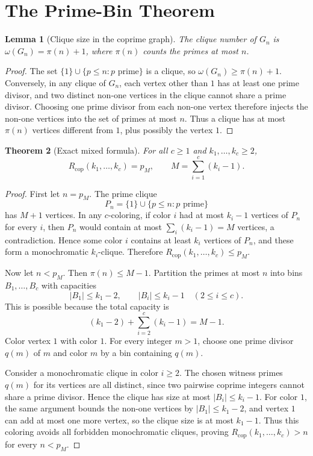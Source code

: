 \documentclass[11pt]{article}
\theoremstyle{plain}
\newtheorem{theorem}{Theorem}[section]
\newtheorem{lemma}[theorem]{Lemma}
\theoremstyle{definition}
\theoremstyle{remark}
\newcommand{\Rcop}{R_{\mathrm{cop}}}
\begin{document}
\section{The Prime-Bin Theorem}
\label{sec:prime-bin}

\begin{lemma}[Clique size in the coprime graph]
\label{lem:max-clique}
The clique number of $G_n$ is $\omega(G_n)=\pi(n)+1$, where $\pi(n)$ counts
the primes at most $n$.
\end{lemma}

\begin{proof}
The set $\{1\}\cup\{p\le n:p\text{ prime}\}$ is a clique, so
$\omega(G_n)\ge \pi(n)+1$.
Conversely, in any clique of $G_n$, each vertex other than $1$ has at least
one prime divisor, and two distinct non-one vertices in the clique cannot
share a prime divisor.  Choosing one prime divisor from each non-one vertex
therefore injects the non-one vertices into the set of primes at most $n$.
Thus a clique has at most $\pi(n)$ vertices different from $1$, plus possibly
the vertex $1$.
\end{proof}

\begin{theorem}[Exact mixed formula]
\label{thm:main}
For all $c\ge 1$ and $k_1,\ldots,k_c\ge 2$,
\[
  \Rcop(k_1,\ldots,k_c)=p_M,
  \qquad
  M=\sum_{i=1}^c(k_i-1).
\]
\end{theorem}

\begin{proof}
First let $n=p_M$.  The prime clique
\[
  P_n=\{1\}\cup\{p\le n:p\text{ prime}\}
\]
has $M+1$ vertices.  In any $c$-coloring, if color $i$ had at most
$k_i-1$ vertices of $P_n$ for every $i$, then $P_n$ would contain at most
$\sum_i(k_i-1)=M$ vertices, a contradiction.  Hence some color $i$ contains
at least $k_i$ vertices of $P_n$, and these form a monochromatic
$k_i$-clique.  Therefore $\Rcop(k_1,\ldots,k_c)\le p_M$.

Now let $n<p_M$.  Then $\pi(n)\le M-1$.  Partition the primes at most $n$
into bins $B_1,\ldots,B_c$ with capacities
\[
  |B_1|\le k_1-2,\qquad |B_i|\le k_i-1\quad (2\le i\le c).
\]
This is possible because the total capacity is
\[
  (k_1-2)+\sum_{i=2}^c(k_i-1)=M-1.
\]
Color vertex $1$ with color $1$.  For every integer $m>1$, choose one prime
divisor $q(m)$ of $m$ and color $m$ by a bin containing $q(m)$.

Consider a monochromatic clique in color $i\ge 2$.  The chosen witness
primes $q(m)$ for its vertices are all distinct, since two pairwise coprime
integers cannot share a prime divisor.  Hence the clique has size at most
$|B_i|\le k_i-1$.  For color $1$, the same argument bounds the non-one
vertices by $|B_1|\le k_1-2$, and vertex $1$ can add at most one more
vertex, so the clique size is at most $k_1-1$.  Thus this coloring avoids
all forbidden monochromatic cliques, proving
$\Rcop(k_1,\ldots,k_c)>n$ for every $n<p_M$.
\end{proof}
\end{document}
